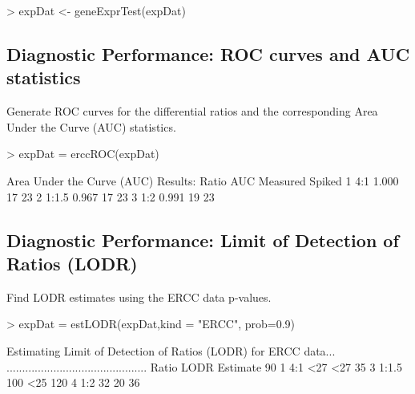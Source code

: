 \documentclass{article}
\begin{document}
\begin{Schunk}
\begin{Sinput}
> expDat <- geneExprTest(expDat)
\end{Sinput}
\end{Schunk}

\subsection{Diagnostic Performance: ROC curves and AUC statistics}
Generate ROC curves for the differential ratios and the corresponding Area Under
the Curve (AUC) statistics.
\begin{center}
\begin{Schunk}
\begin{Sinput}
> expDat = erccROC(expDat)
\end{Sinput}
\begin{Soutput}
Area Under the Curve (AUC) Results:
  Ratio   AUC Measured Spiked
1   4:1 1.000       17     23
2 1:1.5 0.967       17     23
3   1:2 0.991       19     23
\end{Soutput}
\end{Schunk}
\end{center}

\subsection{Diagnostic Performance: Limit of Detection of Ratios (LODR)}
Find LODR estimates using the ERCC data p-values.
\begin{center}
\begin{Schunk}
\begin{Sinput}
> expDat = estLODR(expDat,kind = "ERCC", prob=0.9)
\end{Sinput}
\begin{Soutput}
Estimating Limit of Detection of Ratios (LODR) for  ERCC  data...
.............................................
  Ratio LODR Estimate 90%
1   4:1           <27                <27                 35
3 1:1.5           100                <25                120
4   1:2            32                 20                 36
\end{Soutput}
\end{Schunk}
\end{center}
\end{document}
